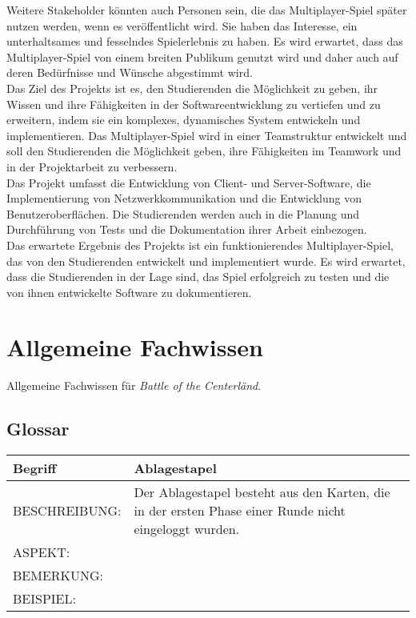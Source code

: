 \documentclass{uulm-assignment}
\newcommand{\game}{Battle of the Centerländ}
\begin{document}
Weitere Stakeholder könnten auch Personen sein, die das Multiplayer-Spiel später nutzen werden, wenn es veröffentlicht wird. Sie haben das Interesse, ein unterhaltsames und fesselndes Spielerlebnis zu haben. Es wird erwartet, dass das Multiplayer-Spiel von einem breiten Publikum genutzt wird und daher auch auf deren Bedürfnisse und Wünsche abgestimmt wird.\\


Das Ziel des Projekts ist es, den Studierenden die Möglichkeit zu geben, ihr Wissen und ihre Fähigkeiten in der Softwareentwicklung zu vertiefen und zu erweitern, indem sie ein komplexes, dynamisches System entwickeln und implementieren. Das Multiplayer-Spiel wird in einer Teamstruktur entwickelt und soll den Studierenden die Möglichkeit geben, ihre Fähigkeiten im Teamwork und in der Projektarbeit zu verbessern.\\

Das Projekt umfasst die Entwicklung von Client- und Server-Software, die Implementierung von Netzwerkkommunikation und die Entwicklung von Benutzeroberflächen. Die Studierenden werden auch in die Planung und Durchführung von Tests und die Dokumentation ihrer Arbeit einbezogen.\\

Das erwartete Ergebnis des Projekts ist ein funktionierendes Multiplayer-Spiel, das von den Studierenden entwickelt und implementiert wurde. Es wird erwartet, dass die Studierenden in der Lage sind, das Spiel erfolgreich zu testen und die von ihnen entwickelte Software zu dokumentieren.
    \section{Allgemeine Fachwissen}

   Allgemeine Fachwissen für \emph{\game}.
   
   
   
	\subsection{Glossar}   
     \begin{tabularx}{\textwidth}{|l|X |} \hline
	        \textbf{Begriff} & \textbf{Ablagestapel} \\
	        \hline
	        BESCHREIBUNG: & Der Ablagestapel besteht aus den Karten, die in der ersten Phase einer Runde nicht eingeloggt wurden. \\
	        \hline
	        ASPEKT: &
	        \\
	        \hline
	        BEMERKUNG: & \\
	        \hline
	        BEISPIEL: & \\
	        \hline
	    \end{tabularx}
\end{document}
